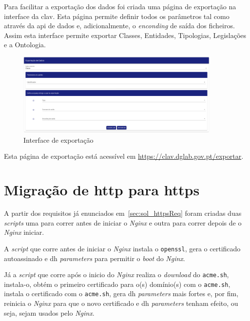 Para facilitar a exportação dos dados foi criada uma página de exportação na interface da \acrshort{clav}. Esta página permite definir todos os parâmetros tal como através da \acrshort{api} de dados e, adicionalmente, o \textit{enconding} de saída dos ficheiros. Assim esta interface permite exportar Classes, Entidades, Tipologias, Legislações e a Ontologia.

\begin{figure}[H]
    \begin{center}
        \includegraphics[width=0.9\textwidth]{img/paginaExportacao.png}
    \end{center}
    \caption{Interface de exportação}
\end{figure}

Esta página de exportação está acessível em \url{https://clav.dglab.gov.pt/exportar}.

\section{Migração de \acrshort{http} para \acrshort{https}}

A partir dos requisitos já enunciados em~\ref{sec:sol_httpsReq} foram criadas duas \textit{scripts} uma para correr antes de iniciar o \textit{Nginx} e outra para correr depois de o \textit{Nginx} iniciar.

A \textit{script} que corre antes de iniciar o \textit{Nginx} instala o \texttt{openssl}, gera o certificado autoassinado e \acrshort{dh} \textit{parameters} para permitir o \textit{boot} do \textit{Nginx}.

Já a \textit{script} que corre após o inicio do \textit{Nginx} realiza o \textit{download} do \texttt{acme.sh}, instala-o, obtém o primeiro certificado para o(s) domínio(s) com o \texttt{acme.sh}, instala o certificado com o \texttt{acme.sh}, gera \acrshort{dh} \textit{parameters} mais fortes e, por fim, reinicia o \textit{Nginx} para que o novo certificado e \acrshort{dh} \textit{parameters} tenham efeito, ou seja, sejam usados pelo \textit{Nginx}.

